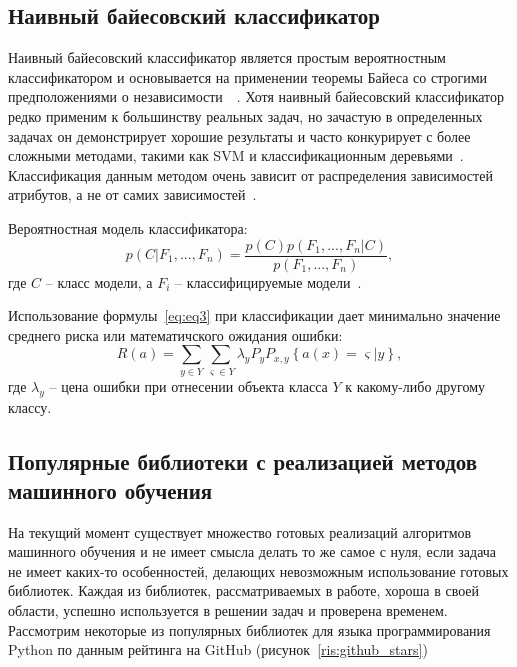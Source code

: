 \subsection{Наивный байесовский классификатор}
Наивный байесовский классификатор является простым вероятностным классификатором и основывается на применении теоремы Байеса со строгими предположениями о независимости~\cite{potapov}~\cite{danilovsv}. Хотя наивный байесовский классификатор редко применим к большинству реальных задач, но зачастую в определенных задачах он демонстрирует хорошие результаты и часто конкурирует с более сложными методами, такими как SVM и классификационным деревьями~\cite{Mirmozaffari}. Классификация данным методом очень зависит от распределения зависимостей атрибутов, а не от самих зависимостей~\cite{juravlev}.
\par
Вероятностная модель классификатора:
\begin{equation}\label{eq:eq3}
p(C|F_{1},...,F_{n}) = \frac{p(C)p(F_{1},...,F_{n}|C)}{p(F_{1},...,F_{n})},
\end{equation}
где $C$ -- класс модели, а $F_{i}$ -- классифицируемые модели~\cite{Mirmozaffari}.
\par
Использование формулы~\eqref{eq:eq3} при классификации дает минимально значение среднего риска или математичского ожидания ошибки:
\begin{equation}\label{eq:eq4}
R(a) = \sum_{y\in Y}\sum_{\varsigma\in Y}\lambda_{y}P_{y}P_{x,y}\left\lbrace a(x)=\varsigma|y \right\rbrace ,
\end{equation}
где $\lambda_{y}$ -- цена ошибки при отнесении объекта класса $Y$ к какому-либо другому классу.


\subsection{Популярные библиотеки с реализацией методов машинного обучения}
На текущий момент существует множество готовых реализаций алгоритмов машинного обучения и не имеет смысла делать то же самое с нуля, если задача не имеет каких-то особенностей, делающих невозможным использование готовых библиотек. Каждая из библиотек, рассматриваемых в работе, хороша в своей области, успешно используется в решении задач и проверена временем. Рассмотрим некоторые из популярных библиотек для языка программирования Python по данным рейтинга на GitHub (рисунок~\ref{ris:github_stars})
\\
